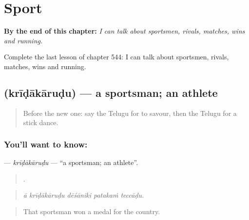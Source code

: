 
\chapter{Sport}
\label{ch:te-sport}

\begin{chapteropening}
\textbf{By the end of this chapter:} \emph{I can talk about sportsmen, rivals, matches, wins and running.}

Complete the last lesson of chapter 544: I can talk about sportsmen, rivals, matches, wins and running.
\end{chapteropening}

\section[\texorpdfstring{\te{క్రీడాకారుడు} (krīḍākāruḍu)}{క్రీడాకారుడు (krīḍākāruḍu)}]{ (krīḍākāruḍu) — a sportsman; an athlete}

\label{lesson:TE-C544-kridakarudu}



\begin{quote}
Before the new one: say the Telugu for to savour, then the Telugu for a stick dance.
\end{quote}

\subsection*{You'll want to know: }
\textbf{} — \emph{krīḍākāruḍu} — \textquotedblleft{}a sportsman; an athlete\textquotedblright{}.

\begin{quote}
    .
\end{quote}

\begin{quote}
\emph{ā krīḍākāruḍu dēśāniki patakaṁ teccāḍu.}
\end{quote}

\begin{quote}
That sportsman won a medal for the country.
\end{quote}

